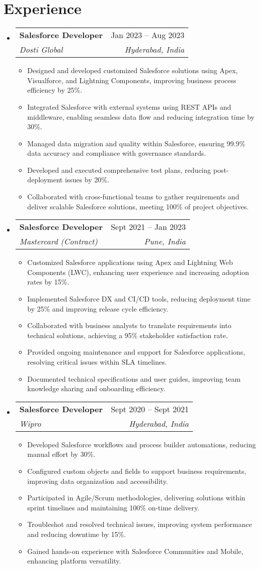 \documentclass{article}
\makeatletter
\newcommand{\resumeItem}[1]{
  \item\small{
    {#1 \vspace{-2pt}}
  }
}
\newcommand{\resumeSubheading}[4]{
  \vspace{-2pt}\item
    \begin{tabular*}{0.97\textwidth}[t]{l@{\extracolsep{\fill}}r}
      \textbf{#1} & #2 \\
      \textit{\small#3} & \textit{\small #4} \\
    \end{tabular*}\vspace{-7pt}
}
\newcommand{\resumeSubHeadingListStart}{\begin{itemize}[leftmargin=0.15in, label={}]}
\newcommand{\resumeSubHeadingListEnd}{\end{itemize}}
\newcommand{\resumeItemListStart}{\begin{itemize}}
\newcommand{\resumeItemListEnd}{\end{itemize}\vspace{-5pt}}
\makeatother
\begin{document}
\section{Experience}
\resumeSubHeadingListStart
\resumeSubheading
{Salesforce Developer}{Jan 2023 – Aug 2023}
{Dosti Global}{Hyderabad, India}
\resumeItemListStart
\resumeItem{Designed and developed customized Salesforce solutions using Apex, Visualforce, and Lightning Components, improving business process efficiency by 25\%.}
\resumeItem{Integrated Salesforce with external systems using REST APIs and middleware, enabling seamless data flow and reducing integration time by 30\%.}
\resumeItem{Managed data migration and quality within Salesforce, ensuring 99.9\% data accuracy and compliance with governance standards.}
\resumeItem{Developed and executed comprehensive test plans, reducing post-deployment issues by 20\%.}
\resumeItem{Collaborated with cross-functional teams to gather requirements and deliver scalable Salesforce solutions, meeting 100\% of project objectives.}
\resumeItemListEnd
\resumeSubheading
{Salesforce Developer}{Sept 2021 – Jan 2023}
{Mastercard (Contract)}{Pune, India}
\resumeItemListStart
\resumeItem{Customized Salesforce applications using Apex and Lightning Web Components (LWC), enhancing user experience and increasing adoption rates by 15\%.}
\resumeItem{Implemented Salesforce DX and CI/CD tools, reducing deployment time by 25\% and improving release cycle efficiency.}
\resumeItem{Collaborated with business analysts to translate requirements into technical solutions, achieving a 95\% stakeholder satisfaction rate.}
\resumeItem{Provided ongoing maintenance and support for Salesforce applications, resolving critical issues within SLA timelines.}
\resumeItem{Documented technical specifications and user guides, improving team knowledge sharing and onboarding efficiency.}
\resumeItemListEnd
\resumeSubheading
{Salesforce Developer}{Sept 2020 – Sept 2021}
{Wipro}{Hyderabad, India}
\resumeItemListStart
\resumeItem{Developed Salesforce workflows and process builder automations, reducing manual effort by 30\%.}
\resumeItem{Configured custom objects and fields to support business requirements, improving data organization and accessibility.}
\resumeItem{Participated in Agile/Scrum methodologies, delivering solutions within sprint timelines and maintaining 100\% on-time delivery.}
\resumeItem{Troubleshot and resolved technical issues, improving system performance and reducing downtime by 15\%.}
\resumeItem{Gained hands-on experience with Salesforce Communities and Mobile, enhancing platform versatility.}
\resumeItemListEnd
\resumeSubHeadingListEnd
\end{document}
